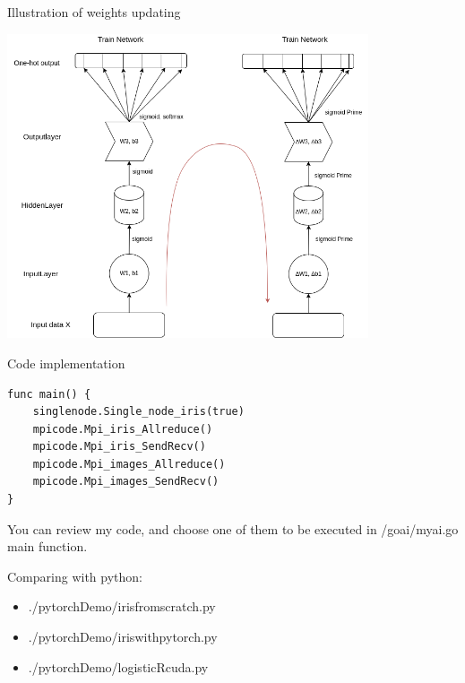 \documentclass[presentation]{beamer}
\begin{document}
\begin{frame}[label={sec:orgaf239ea}]{Illustration of weights updating}
\begin{center}
\includegraphics[width=0.8\textwidth]{./png/NeuralNetwork.png}
\end{center}
\end{frame}

\begin{frame}[label={sec:orga939ba6},fragile]{Code implementation}
 \begin{verbatim}
func main() {
	singlenode.Single_node_iris(true)
	mpicode.Mpi_iris_Allreduce()
	mpicode.Mpi_iris_SendRecv()
	mpicode.Mpi_images_Allreduce()
	mpicode.Mpi_images_SendRecv()
}
\end{verbatim}

You can review my code, and choose one of them to be executed in /goai/myai.go main function.

Comparing with python:

\begin{itemize}
\item ./pytorchDemo/irisfromscratch.py
\item ./pytorchDemo/iriswithpytorch.py
\item ./pytorchDemo/logisticRcuda.py
\end{itemize}
\end{frame}
\end{document}
